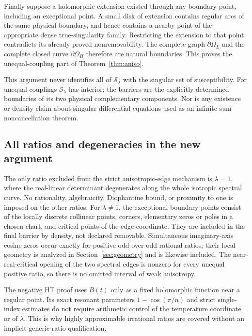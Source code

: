 \documentclass[11pt]{article}
\numberwithin{equation}{section}
\theoremstyle{definition}
\newcommand{\cS}{\mathcal S}
\newcommand{\OH}{\Omega_H}
\newcommand{\OL}{\Omega_L}
\begin{document}
Finally suppose a holomorphic extension existed through any boundary
point, including an exceptional point. A small disk of extension contains
regular arcs of the same physical boundary, and hence contains a nearby
point of the appropriate dense true-singularity family. Restricting the
extension to that point contradicts its already proved nonremovability.
The complete graph $\partial\OL$ and the complete closed curve
$\partial\OH$ therefore are natural boundaries. This proves
the unequal-coupling part of Theorem~\ref{thm:aniso}.

This argument never identifies all of $\cS_\lambda$ with the singular
set of susceptibility. For unequal couplings $\cS_\lambda$ has interior;
the barriers are the explicitly determined boundaries of its two
physical complementary components. Nor is any existence or density
claim about singular differential equations used as an infinite-sum
noncancellation theorem.

\subsection{All ratios and degeneracies in the new argument}
The only ratio excluded from the strict anisotropic-edge mechanism is
$\lambda=1$, where the real-linear determinant degenerates along the
whole isotropic spectral curve. No rationality, algebraicity,
Diophantine bound, or proximity to one is imposed on the other ratios.
For $\lambda\ne1$, the exceptional boundary points consist of the
locally discrete collinear points, corners, elementary zeros or poles
in a chosen chart, and critical points of the edge coordinate. They
are included in the final barrier by density, not declared removable.
Simultaneous imaginary-axis cosine zeros occur exactly for positive
odd-over-odd rational ratios; their local geometry is analyzed in
Section~\ref{sec:geometry} and is likewise included. The near-real-critical
opening of the two spectral edges is nonzero for every unequal positive
ratio, so there is no omitted interval of weak anisotropy.

The negative HT proof uses $B(t)$ only as a fixed holomorphic function
near a regular point. Its exact resonant parameters
$1-\cos(\pi/n)$ and strict single-index estimates do not require
arithmetic control of the temperature coordinate or of $\lambda$.
This is why highly approximable irrational ratios are covered without
an implicit generic-ratio qualification.
\end{document}
